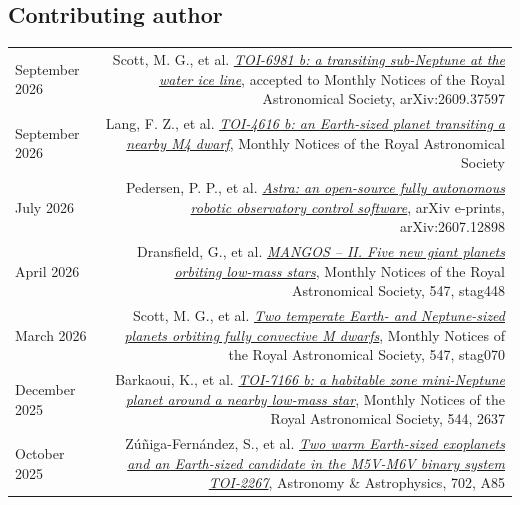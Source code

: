 \documentclass{article}
\begin{document}
\subsection*{Contributing author}
\begin{longtable}{L!{\vrule}R}
    September 2026 &
    Scott, M. G., et al.
    \href{https://ui.adsabs.harvard.edu/abs/2026arXiv260937597S/abstract}{\textit{TOI-6981 b: a transiting sub-Neptune at the water ice line}},
    accepted to Monthly Notices of the Royal Astronomical Society, arXiv:2609.37597 \\

    September 2026 &
    Lang, F. Z., et al.
    \href{https://ui.adsabs.harvard.edu/abs/2026MNRAS.tmp.1622L/abstract}{\textit{TOI-4616 b: an Earth-sized planet transiting a nearby M4 dwarf}},
    Monthly Notices of the Royal Astronomical Society \\

    July 2026 &
    Pedersen, P. P., et al.
    \href{https://ui.adsabs.harvard.edu/abs/2026arXiv260712898P/abstract}{\textit{Astra: an open-source fully autonomous robotic observatory control software}},
    arXiv e-prints, arXiv:2607.12898 \\ 

    April 2026 &
    Dransfield, G., et al.
    \href{https://ui.adsabs.harvard.edu/abs/2026MNRAS.547ag448D/abstract}{\textit{MANGOS -- II. Five new giant planets orbiting low-mass stars}},
    Monthly Notices of the Royal Astronomical Society, 547, stag448 \\

    March 2026 &
    Scott, M. G., et al.
    \href{https://ui.adsabs.harvard.edu/abs/2026MNRAS.547ag070S/abstract}{\textit{Two temperate Earth- and Neptune-sized planets orbiting fully convective M dwarfs}},
    Monthly Notices of the Royal Astronomical Society, 547, stag070 \\

    December 2025 &
    Barkaoui, K., et al.
    \href{https://ui.adsabs.harvard.edu/abs/2025MNRAS.544.2637B/abstract}{\textit{TOI-7166 b: a habitable zone mini-Neptune planet around a nearby low-mass star}},
    Monthly Notices of the Royal Astronomical Society, 544, 2637 \\

    October 2025 &
    Zúñiga-Fernández, S., et al.
    \href{https://ui.adsabs.harvard.edu/abs/2025A%26A...702A..85Z/abstract}{\textit{Two warm Earth-sized exoplanets and an Earth-sized candidate in the M5V-M6V binary system TOI-2267}},
    Astronomy \& Astrophysics, 702, A85 \\


\end{longtable}
\end{document}
